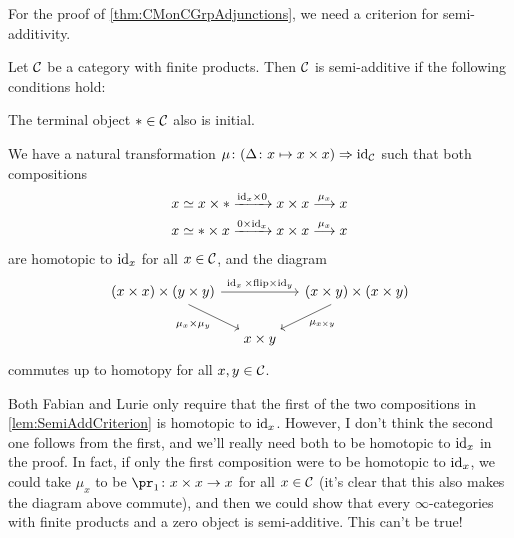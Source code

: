 \documentclass[a4paper, 10pt, oneside, DIV=9, chapterprefix=true, numbers=enddot,bibliography=totoc]{scrbook}
\begin{document}
For the proof of \cref{thm:CMonCGrpAdjunctions}, we need a criterion for semi-additivity.
\begin{lem}\label{lem:SemiAddCriterion}
	Let $\mathcal{C}$ be a category with finite products. Then $\mathcal{C}$ is semi-additive if the following conditions hold:
	\begin{alphanumerate}
		\item The terminal object $*\in \mathcal{C}$ also is initial.
		\item We have a natural transformation $\mu\colon (\Delta\colon x\mapsto x\times x)\Rightarrow\operatorname{id}_{\mathcal{C}}$ such that both compositions
		\begin{align*}
			x&\simeq x\times *\xrightarrow{{\id_x}\times 0} x\times x\morphism[\mu_x]x\\
			 x&\simeq *\times x\xrightarrow{0\times{\id_x}} x\times x\morphism[\mu_x]x
		\end{align*}
		are homotopic to $\operatorname{id}_x$ for all $x\in \mathcal{C}$, and the diagram
		\begin{equation*}
			\begin{tikzcd}[column sep=small]
				(x\times x)\times (y\times y)\drar["\mu_x\times \mu_y"']\ar[rr,"\id_x\times\mathrm{flip}\times \id_y"] & & (x\times y)\times (x\times y)\dlar["\mu_{x\times y}"]\\
				& x\times y & 
			\end{tikzcd}
		\end{equation*}
		commutes up to homotopy for all $x,y\in \mathcal{C}$.
	\end{alphanumerate}
\end{lem}
\begin{rem*}
	Both Fabian and Lurie only require that the first of the two compositions in \cref{lem:SemiAddCriterion} is homotopic to $\operatorname{id}_x$. However, I don't think the second one follows from the first, and we'll really need both to be homotopic to $\operatorname{id}_x$ in the proof. In fact, if only the first composition were to be homotopic to $\operatorname{id}_x$, we could take $\mu_x$ to be $\pr_1\colon x\times x\morphism x$ for all $x\in \mathcal{C}$ (it's clear that this also makes the diagram above commute), and then we could show that every $\infty$-categories with finite products and a zero object is semi-additive. This can't be true!
\end{rem*}
\end{document}
